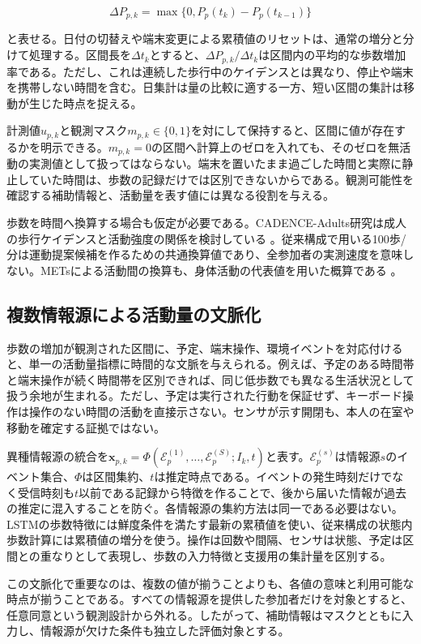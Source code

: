 \[
\Delta P_{p,k}=\max\{0,P_p(t_k)-P_p(t_{k-1})\}
\]

と表せる。日付の切替えや端末変更による累積値のリセットは、通常の増分と分けて処理する。区間長を\(\Delta t_k\)とすると、\(\Delta P_{p,k}/\Delta t_k\)は区間内の平均的な歩数増加率である。ただし、これは連続した歩行中のケイデンスとは異なり、停止や端末を携帯しない時間を含む。日集計は量の比較に適する一方、短い区間の集計は移動が生じた時点を捉える。

計測値\(u_{p,k}\)と観測マスク\(m_{p,k}\in\{0,1\}\)を対にして保持すると、区間に値が存在するかを明示できる。\(m_{p,k}=0\)の区間へ計算上のゼロを入れても、そのゼロを無活動の実測値として扱ってはならない。端末を置いたまま過ごした時間と実際に静止していた時間は、歩数の記録だけでは区別できないからである。観測可能性を確認する補助情報と、活動量を表す値には異なる役割を与える。

歩数を時間へ換算する場合も仮定が必要である。CADENCE-Adults研究は成人の歩行ケイデンスと活動強度の関係を検討している \autocite{tudorlocke2019cadence}。従来構成で用いる100歩/分は運動提案候補を作るための共通換算値であり、全参加者の実測速度を意味しない。METsによる活動間の換算も、身体活動の代表値を用いた概算である \autocite{ainsworth2011compendium}。

\subsection{複数情報源による活動量の文脈化}

歩数の増加が観測された区間に、予定、端末操作、環境イベントを対応付けると、単一の活動量指標に時間的な文脈を与えられる。例えば、予定のある時間帯と端末操作が続く時間帯を区別できれば、同じ低歩数でも異なる生活状況として扱う余地が生まれる。ただし、予定は実行された行動を保証せず、キーボード操作は操作のない時間の活動を直接示さない。センサが示す開閉も、本人の在室や移動を確定する証拠ではない。

異種情報源の統合を\(\boldsymbol{x}_{p,k}=\Phi(\mathcal{E}_{p}^{(1)},\ldots,\mathcal{E}_{p}^{(S)};I_k,t)\)と表す。\(\mathcal{E}_{p}^{(s)}\)は情報源\(s\)のイベント集合、\(\Phi\)は区間集約、\(t\)は推定時点である。イベントの発生時刻だけでなく受信時刻も\(t\)以前である記録から特徴を作ることで、後から届いた情報が過去の推定に混入することを防ぐ。各情報源の集約方法は同一である必要はない。LSTMの歩数特徴には鮮度条件を満たす最新の累積値を使い、従来構成の状態内歩数計算には累積値の増分を使う。操作は回数や間隔、センサは状態、予定は区間との重なりとして表現し、歩数の入力特徴と支援用の集計量を区別する。

この文脈化で重要なのは、複数の値が揃うことよりも、各値の意味と利用可能な時点が揃うことである。すべての情報源を提供した参加者だけを対象とすると、任意同意という観測設計から外れる。したがって、補助情報はマスクとともに入力し、情報源が欠けた条件も独立した評価対象とする。

